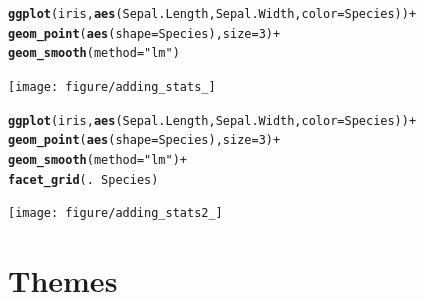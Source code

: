 \documentclass{beamer}\usepackage[]{graphicx}\usepackage[]{color}
\makeatletter
\newcommand{\hlstr}[1]{\textcolor[rgb]{0.192,0.494,0.8}{#1}}%
\newcommand{\hlkwd}[1]{\textcolor[rgb]{0.737,0.353,0.396}{\textbf{#1}}}%
\newenvironment{kframe}{%
 \def\at@end@of@kframe{}%
 \ifinner\ifhmode%
  \def\at@end@of@kframe{\end{minipage}}%
  \begin{minipage}{\columnwidth}%
 \fi\fi%
 \def\FrameCommand##1{\hskip\@totalleftmargin \hskip-\fboxsep
 \colorbox{shadecolor}{##1}\hskip-\fboxsep
     \hskip-\linewidth \hskip-\@totalleftmargin \hskip\columnwidth}%
 \MakeFramed {\advance\hsize-\width
   \@totalleftmargin\z@ \linewidth\hsize
   \@setminipage}}%
 {\par\unskip\endMakeFramed%
 \at@end@of@kframe}
\newenvironment{knitrout}{}{} %
\makeatother
\begin{document}

\begin{frame}[fragile]
\begin{knitrout}\footnotesize
{}\color{fgcolor}\begin{kframe}
\begin{alltt}
\hlkwd{ggplot}(iris, \hlkwd{aes}(Sepal.Length, Sepal.Width, color = Species)) +
\hlkwd{geom_point}(\hlkwd{aes}(shape = Species), size = 3) +
\hlkwd{geom_smooth}(method = \hlstr{"lm"})
\end{alltt}
\end{kframe}

{\centering \texttt{[image: figure/adding\_stats\_]} 

}



\end{knitrout}

\end{frame}


\begin{frame}[fragile]
\begin{knitrout}\footnotesize
{}\color{fgcolor}\begin{kframe}
\begin{alltt}
\hlkwd{ggplot}(iris, \hlkwd{aes}(Sepal.Length, Sepal.Width, color = Species)) +
\hlkwd{geom_point}(\hlkwd{aes}(shape = Species), size = 3) +
\hlkwd{geom_smooth}(method = \hlstr{"lm"}) +
\hlkwd{facet_grid}(. ~ Species)
\end{alltt}
\end{kframe}

{\centering \texttt{[image: figure/adding\_stats2\_]} 

}



\end{knitrout}

\end{frame}


\section*{Themes}
\frame{\sectionpage}
\end{document}
